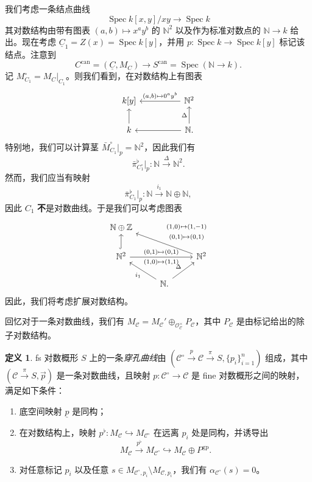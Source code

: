 \documentclass{amsart}
\theoremstyle{definition}
\newtheorem{defn}[thm]{定义}
\theoremstyle{remark}
\theoremstyle{plain}
\theoremstyle{definition}
\theoremstyle{remark}
\newcommand{\N}{\mathbb{N}}
\newcommand{\Z}{\mathbb{Z}}
\newcommand{\mc}[1]{\mathcal{#1}}
\newcommand{\mr}[1]{\mathrm{#1}}
\newcommand{\on}[1]{\operatorname{#1}}
\newcommand{\ul}[1]{\underline{#1}}
\newcommand{\1}{\mathbf{1}}
\newcommand{\2}{\mathbf{2}}
\newcommand{\3}{\mathbf{3}}
\DeclareMathOperator{\Spec}{Spec}
\begin{document}
我们考虑一条结点曲线
\[ \Spec k[x,y]/xy \to \Spec k \]
其对数结构由带有图表 \((a,b) \mapsto x^a y^b\) 的 \(\N^2\) 以及作为标准对数点的 \(\N \to k\) 给出。现在考虑 \(\ul{C}_1 = Z(x) = \Spec k[y]\)，并用 \(p \colon \Spec k \to \Spec k[y]\) 标记该结点。注意到
\[ C^{\on{can}} = (\ul{C}, M_C) \to S^{\on{can}} = \Spec(\N \to k). \]
记 \(M_{C_1}^{\circ} = M_C|_{C_1}\)。则我们看到，在对数结构上有图表
\begin{equation*}
\begin{tikzcd}
    k[y] & & \N^2 \ar{ll}[swap]{(a,b) \mapsto 0^a y^b} \\
    k \ar{u} & & \N \ar{ll} \ar{u}{\Delta}.
\end{tikzcd}
\end{equation*}
特别地，我们可以计算茎 \(\bar{M}_{C_1}^{\circ}|_p = \N^2\)，因此我们有
\[ \bar{\pi}_{C_1^{\circ}}^{\flat} |_p \colon \N \xrightarrow{\Delta} \N^2. \]
然而，我们应当有映射
\[ \bar{\pi}^{\flat}_{C_1}|_p \colon \N \xrightarrow{i_1} \N \oplus \N, \]
因此 \(C_1\) \textbf{不}是对数曲线。于是我们可以考虑图表
\begin{equation*}
\begin{tikzcd}
    \N \oplus \Z \\
    \N^2 \ar[hookrightarrow]{u} \ar{rr}{(0,1)\mapsto (0,1)}[swap]{(1,0)\mapsto (1,1)} & & \N^2 \ar{ull}[swap]{\Vectorstack{{(1,0)\mapsto(1,-1)} {(0,1)\mapsto(0,1)}}} \\
    & \N \ar{ul}{i_1} \ar{ur}{\Delta}.
\end{tikzcd}
\end{equation*}
因此，我们将考虑扩展对数结构。

回忆对于一条对数曲线，我们有 \(M_{\mc{C}} = M_{\mc{C}}' \oplus_{\mc{O}_{\mc{C}}^{\times}} P_{\mc{C}}\)，其中 \(P_{\mc{C}}\) 是由标记给出的除子对数结构。

\begin{defn}
    fs 对数概形 \(S\) 上的一条\textit{穿孔曲线}由 \((\mc{C}^{\circ} \xrightarrow{p} \mc{C} \xrightarrow{\pi} S, \{p_i\}_{i=1}^n)\) 组成，其中 \((\mc{C} \xrightarrow{\pi} S, \vec{p})\) 是一条对数曲线，且映射 \(p \colon \mc{C}^{\circ} \to \mc{C}\) 是 fine 对数概形之间的映射，满足如下条件：
    \begin{enumerate}
        \item 底空间映射 \(\ul{p}\) 是同构；
        \item 在对数结构上，映射 \(p^{\flat} \colon M_{\mc{C}} \hookrightarrow M_{\mc{C}^{\circ}}\) 在远离 \(p_i\) 处是同构，并诱导出
            \[ M_{\mc{C}} \xrightarrow{p^{\flat}} M_{\mc{C}^{\circ}} \hookrightarrow M_{\mc{C}} \oplus P^{\mr{gp}}. \]
        \item 对任意标记 \(p_i\) 以及任意 \(s \in M_{\mc{C}^{\circ}, p_i} \setminus M_{\mc{C}, p_i}\)，我们有 \(\alpha_{\mc{C}^{\circ}}(s) = 0\)。
    \end{enumerate}
\end{defn}
\end{document}
